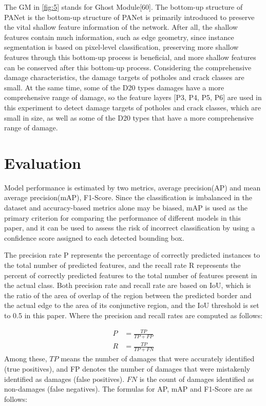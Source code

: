 \documentclass[sensors,article,submit,moreauthors]{Definitions/mdpi}
\begin{document}
    The GM in \autoref{fig:5} stands for Ghost Module[60]\citep{Han_2020_CVPR}. The bottom-up structure of PANet is the bottom-up structure of PANet is primarily introduced to preserve the vital shallow feature information of the network. After all, the shallow features contain much information, such as edge geometry, since instance segmentation is based on pixel-level classification, preserving more shallow features through this bottom-up process is beneficial, and more shallow features can be conserved after this bottom-up process. Considering the comprehensive damage characteristics, the damage targets of potholes and crack classes are small. At the same time, some of the D20 types damages have a more comprehensive range of damage, so the feature layers [P3, P4, P5, P6] are used in this experiment to detect damage targets of potholes and crack classes, which are small in size, as well as some of the D20 types that have a more comprehensive range of damage.



    \section{Evaluation}


    Model performance is estimated by two metrics, average precision(AP) and mean average precision(mAP), F1-Score. Since the classification is imbalanced in the dataset and accuracy-based metrics alone may be biased, mAP is used as the primary criterion for comparing the performance of different models in this paper, and it can be used to assess the risk of incorrect classification by using a confidence score assigned to each detected bounding box.

    The precision rate P represents the percentage of correctly predicted instances to the total number of predicted features, and the recall rate R represents the percent of correctly predicted features to the total number of features present in the actual class. Both precision rate and recall rate are based on IoU, which is the ratio of the area of overlap of the region between the predicted border and the actual edge to the area of its conjunctive region, and the IoU threshold is set to 0.5 in this paper. Where the precision and recall rates are computed as follows:

    \begin{align}
        P &= \frac{TP}{TP+FP} \\
        R &= \frac{TP}{TP+FN}
    \end{align}
    Among these, $TP$ means the number of damages that were accurately identified (true positives), and FP denotes the number of damages that were mistakenly identified as damages (false positives). $FN$ is the count of damages identified as non-damages (false negatives).
    The formulas for AP, mAP and F1-Score are as follows:
\end{document}
